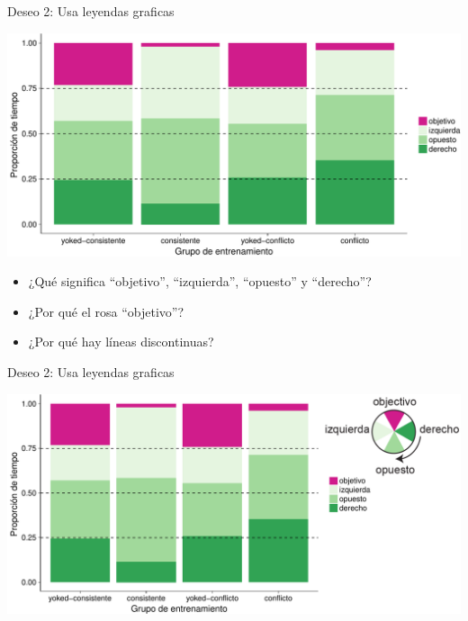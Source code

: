 \documentclass[ignorenonframetext,]{beamer}
\providecommand{\tightlist}{%
  \setlength{\itemsep}{0pt}\setlength{\parskip}{0pt}}
\begin{document}
\begin{frame}{Deseo 2: Usa leyendas graficas}

\includegraphics{../figures/talk/timespent-1.pdf}

\begin{itemize}[<+->]
\tightlist
\item
  ¿Qué significa ``objetivo'', ``izquierda'', ``opuesto'' y ``derecho''?
\item
  ¿Por qué el rosa ``objetivo''?
\item
  ¿Por qué hay líneas discontinuas?
\end{itemize}

\end{frame}

\begin{frame}{Deseo 2: Usa leyendas graficas}

\includegraphics{../figures/talk/timespent2-1.pdf}


\end{frame}
\end{document}
